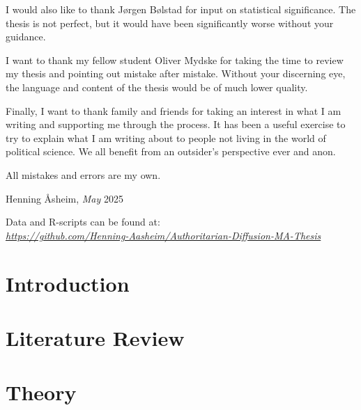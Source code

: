 \documentclass[12pt]{report} %
\begin{document}
I would also like to thank Jørgen Bølstad for input on statistical significance. The thesis is not perfect, but it would have been significantly worse without your guidance.

I want to thank my fellow student Oliver Mydske for taking the time to review my thesis and pointing out mistake after mistake. Without your discerning eye, the language and content of the thesis would be of much lower quality. 

Finally, I want to thank family and friends for taking an interest in what I am writing and supporting me through the process. It has been a useful exercise to try to explain what I am writing about to people not living in the world of political science. We all benefit from an outsider's perspective ever and anon.

\vspace{5mm}
\noindent
All mistakes and errors are my own. 

\vspace{5mm}
\noindent
Henning Åsheim, \textit{May} 2025

\newpage
\thispagestyle{empty}
\vspace*{\fill}
\begin{center}
    Data and R-scripts can be found at: \\
    \href{https://github.com/Henning-Aasheim/Authoritarian-Diffusion-MA-Thesis}{\textit{https://github.com/Henning-Aasheim/Authoritarian-Diffusion-MA-Thesis}}
\end{center}
\vspace*{\fill}

\newpage

\tableofcontents

\listoffigures

\listoftables

\chapter{Introduction} \label{chp:introduction}


\chapter{Literature Review} \label{chp:literature}


\chapter{Theory} \label{chp:theory}

\end{document}
